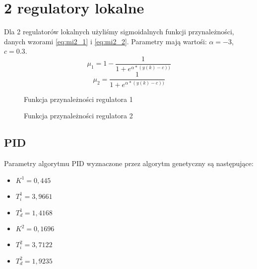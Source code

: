 \section{2 regulatory lokalne}
Dla 2 regulatorów lokalnych użyliśmy sigmoidalnych funkcji przynależności, danych wzorami \ref{eq:mi2_1} i \ref{eq:mi2_2}. Parametry mają wartośi: $\alpha = -3$, $c = 0.3$.
\begin{equation} \label{eq:mi2_1}
\mu_1 = 1 - \frac{1}{1+e^{\alpha * (y(k)-c))}}
\end{equation}
\begin{equation} \label{eq:mi2_2}
\mu_2 = \frac{1}{1+e^{\alpha * (y(k)-c))}}
\end{equation}

\begin{figure}[H]
\centering
{}
\caption{Funkcja przynależności regulatora 1}
\label{fig:mi2_1}
\end{figure}

\begin{figure}[H]
\centering
{}
\caption{Funkcja przynależności regulatora 2}
\label{fig:mi2_2}
\end{figure}

\subsection{PID}
Parametry algorytmu PID wyznaczone przez algorytm genetyczny są następujące:
\begin{itemize}
\item $K^1 = 0,445$
\item $T^1_i = 3,9661$
\item $T^1_d = 1,4168$
\\
\item $K^2 = 0,1696$
\item $T^2_i = 3,7122$
\item $T^2_d = 1,9235$
\end{itemize}

